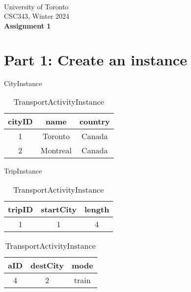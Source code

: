 \documentclass{article}
\begin{document}
~~~\vspace{-2.0cm}

\noindent
University of Toronto\\
CSC343, Winter 2024\\[10pt]
{\LARGE\bf Assignment 1}

\section*{Part 1: Create an instance}

\begin{table}[H]
\parbox{.3\linewidth}{
    \centering
    \caption*{CityInstance}
    \begin{tabular}{|c|c|c|} 
    \hline
    cityID & name & country \\ [.5ex] 
    \hline\hline
    1 & Toronto & Canada \\
    \hline
    2 & Montreal & Canada \\
    \hline
    \end{tabular}
}
\hfill
\parbox{.3\linewidth}{
    \centering
    \caption*{TripInstance}
    \begin{tabular}{|c|c|c|} 
    \hline
    tripID & startCity & length \\ [.5ex] 
    \hline\hline
    1 & 1 & 4 \\
    \hline
    \end{tabular}
}
\hfill
\parbox{.3\linewidth}{
    \centering
    \caption*{TransportActivityInstance}
    \begin{tabular}{|c|c|c|} 
    \hline
    aID & destCity & mode \\ [.5ex] 
    \hline\hline
    4 & 2 & train \\
    \hline
    \end{tabular}
}
\end{table}
\end{document}
